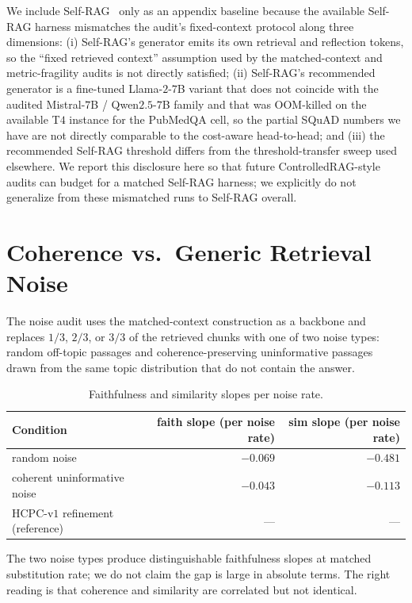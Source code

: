 \documentclass[11pt]{article}
\begin{document}
We include Self-RAG~\citep{asai2024selfrag} only as an appendix
baseline because the available Self-RAG harness mismatches the audit's
fixed-context protocol along three dimensions: (i) Self-RAG's
generator emits its own retrieval and reflection tokens, so the
``fixed retrieved context'' assumption used by the matched-context and
metric-fragility audits is not directly satisfied; (ii) Self-RAG's
recommended generator is a fine-tuned Llama-$2$-$7$B variant that does
not coincide with the audited Mistral-$7$B / Qwen$2.5$-$7$B family
and that was OOM-killed on the available T$4$ instance for the
PubMedQA cell, so the partial SQuAD numbers we have are not directly
comparable to the cost-aware head-to-head; and (iii) the
recommended Self-RAG threshold differs from the threshold-transfer
sweep used elsewhere. We report this disclosure here so that future
ControlledRAG-style audits can budget for a matched Self-RAG harness;
we explicitly do not generalize from these mismatched runs to Self-RAG
overall.

\section{Coherence vs.\ Generic Retrieval Noise}
\label{supp:noise}

The noise audit uses the matched-context construction as a backbone
and replaces $1/3$, $2/3$, or $3/3$ of the retrieved chunks with one
of two noise types: random off-topic passages and coherence-preserving
uninformative passages drawn from the same topic distribution that do
not contain the answer.

\begin{table}[!htb]
\centering
\caption{Faithfulness and similarity slopes per noise rate.}
\footnotesize
\begin{tabular}{lrr}
\toprule
Condition & faith slope (per noise rate) & sim slope (per noise rate) \\
\midrule
random noise                     & $-0.069$ & $-0.481$ \\
coherent uninformative noise     & $-0.043$ & $-0.113$ \\
HCPC-v$1$ refinement (reference) & ---      & ---      \\
\bottomrule
\end{tabular}
\end{table}

The two noise types produce distinguishable faithfulness slopes at
matched substitution rate; we do not claim the gap is large in absolute
terms. The right reading is that coherence and similarity are
correlated but not identical.
\end{document}
